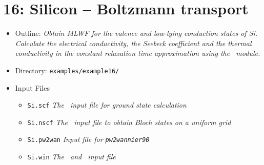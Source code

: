 \documentclass[a4paper,11pt,twoside]{article}
\begin{document}
\section*{16: Silicon -- Boltzmann transport}
\begin{itemize}
\item{Outline: \it{Obtain MLWF for the valence and low-lying
    conduction states of Si. Calculate the electrical conductivity, the
    Seebeck coefficient and the thermal conductivity in the constant
    relaxation time approximation using the \bw\ module.}} 
\item{Directory: {\tt examples/example16/}}
\item{Input Files}
\begin{itemize}
\item{ {\tt Si.scf}  {\it The \pwscf\ input file for ground state
    calculation}} 
\item{ {\tt Si.nscf}  {\it The \pwscf\ input file to obtain Bloch
    states on a uniform grid}} 
\item{ {\tt Si.pw2wan}  {\it Input file for {\tt pw2wannier90}}}
\item{ {\tt Si.win}  {\it The \wannier\ and \postw\ input file}}
\end{itemize}

\end{itemize}
\end{document}
